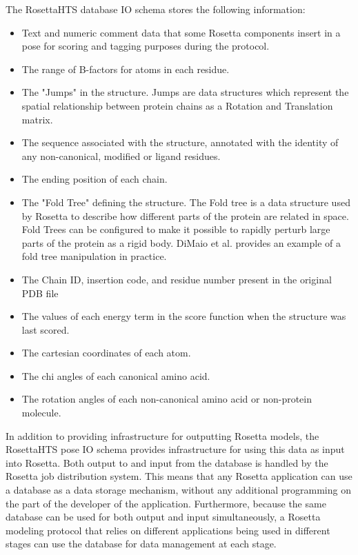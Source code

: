 The RosettaHTS database IO schema stores the following information:

\begin{itemize}
	\item Text and numeric comment data that some Rosetta components insert in a pose for scoring and tagging purposes during the protocol.
	\item The range of B-factors for atoms in each residue.
	\item The "Jumps" in the structure.  Jumps are data structures which represent the spatial relationship between protein chains as a Rotation and Translation matrix.
	\item The sequence associated with the structure, annotated with the identity of any non-canonical, modified or ligand residues.
	\item The ending position of each chain.
	\item The "Fold Tree" defining the structure.  The Fold tree is a data structure used by Rosetta to describe how different parts of the protein are related in space.  Fold Trees can be configured to make it possible to rapidly perturb large parts of the protein as a rigid body.  DiMaio et al. \citep{DiMaio:2011cu} provides an example of a fold tree manipulation in practice.
	\item The Chain ID, insertion code, and residue number present in the original PDB file
	\item The values of each energy term in the score function when the structure was last scored.
	\item The cartesian coordinates of each atom.
	\item The chi angles of each canonical amino acid.
	\item The rotation angles of each non-canonical amino acid or non-protein molecule.
\end{itemize}

In addition to providing infrastructure for outputting Rosetta models, the RosettaHTS pose IO schema provides infrastructure for using this data as input into Rosetta.
Both output to and input from the database is handled by the Rosetta job distribution system.
This means that any Rosetta application can use a database as a data storage mechanism, without any additional programming on the part of the developer of the application.
Furthermore, because the same database can be used for both output and input simultaneously, a Rosetta modeling protocol that relies on different applications being used in different stages can use the database for data management at each stage.

